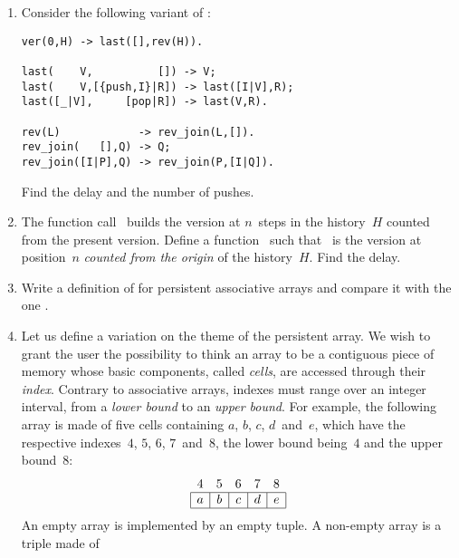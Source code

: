\begin{enumerate}

  \item Consider the following variant of :
\begin{verbatim}
ver(0,H) -> last([],rev(H)).

last(    V,          []) -> V;
last(    V,[{push,I}|R]) -> last([I|V],R);
last([_|V],     [pop|R]) -> last(V,R).

rev(L)            -> rev_join(L,[]).
rev_join(   [],Q) -> Q;
rev_join([I|P],Q) -> rev_join(P,[I|Q]).
\end{verbatim}
    Find the delay and the number of pushes.

  \item The function call~
     builds the version at \(n\)~steps in the
    history~\(H\) counted from the present version. Define a
    function~ such that
    ~is the version at position~\(n\)
    \emph{counted from the origin} of the history~\(H\). Find the
    delay.

  \item Write a definition of  for persistent
    associative arrays and compare it with the one
    .

  \item Let us define a variation on the theme of the persistent
    array. We wish to grant the user the possibility to think an array
    to be a contiguous piece of memory whose basic components, called
    \emph{cells}, are accessed through their \emph{index}. Contrary to
    associative arrays, indexes must range over an integer interval,
    from a \emph{lower bound} to an \emph{upper bound}. For example,
    the following array is made of five cells containing \(a\), \(b\),
    \(c\), \(d\)~and~\(e\), which have the respective indexes~\(4\),
    \(5\), \(6\), \(7\)~and~\(8\), the lower bound being~\(4\) and the
    upper bound~\(8\):
    \[
    \begin{array}{|c|c|c|c|c|}
      \multicolumn{1}{c}{4} &
      \multicolumn{1}{c}{5} &
      \multicolumn{1}{c}{6} &
      \multicolumn{1}{c}{7} &
      \multicolumn{1}{c}{8}\\
      \hline
      a & b & c & d & e\\
      \hline
    \end{array}
    \]
    An empty array is implemented by an empty tuple. A non\hyp{}empty
    array is a triple made of
    \begin{enumerate}


\end{enumerate}
\end{enumerate}
